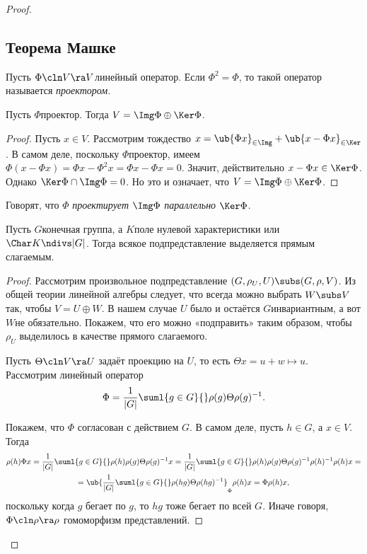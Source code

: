 \documentclass[a4paper]{article}
\newcommand{\sumlg}{\suml{g \in G}{}}
\begin{document}
\begin{proof}
\subsection{Теорема Машке}

\begin{df}
Пусть $\Phi\cln V \ra V$\т линейный оператор. Если $\Phi^2=\Phi$, то такой оператор  называется
\emph{проектором}.
\end{df}

\begin{theorem}
Пусть $\Phi$\т проектор. Тогда $V = \Img \Phi \oplus \Ker \Phi$.
\end{theorem}
\begin{proof}
Пусть $x \in V$. Рассмотрим тождество $x = \ub{\Phi x}_{\in \Img} + \ub{x - \Phi x}_{\in \Ker}$. В  самом
деле, поскольку $\Phi$\т проектор, имеем $\Phi(x-\Phi x) = \Phi x - \Phi^2 x = \Phi x - \Phi x = 0$. Значит,
действительно $x - \Phi x \in \Ker \Phi$. Однако $\Ker \Phi \cap \Img \Phi = 0$. Но это и означает, что $V =
\Img \Phi \oplus \Ker \Phi$.
\end{proof}

Говорят, что $\Phi$ \emph{проектирует} $\Img \Phi$ \emph{параллельно} $\Ker \Phi$.

\begin{theorem}
Пусть $G$\т конечная группа, а $K$\т поле нулевой характеристики или $\Char K \ndivs |G|$.  Тогда всякое
подпредставление выделяется прямым слагаемым.
\end{theorem}
\begin{proof}
Рассмотрим произвольное подпредставление $(G, \rho_U, U) \subs (G, \rho, V)$. Из общей  теории линейной
алгебры следует, что всегда можно выбрать $W \subs V$ так, чтобы $V = U \oplus W$. В нашем случае $U$ было и
остаётся $G$\д инвариантным, а вот $W$\т не обязательно. Покажем, что его можно «подправить» таким образом,
чтобы $\rho_U$ выделилось в качестве прямого слагаемого.

Пусть $\Theta\cln V \ra U$ задаёт проекцию на $U$, то есть $\Theta x = u + w \mapsto u$.  Рассмотрим линейный
оператор
$$
  \Phi = \frac{1}{|G|}\sumlg \rho(g) \Theta \rho(g)^{-1}.
$$

Покажем, что $\Phi$ согласован с действием $G$. В самом деле, пусть $h \in G$, а $x \in V$. Тогда
\begin{multline*}
\rho(h)\Phi x = \frac{1}{|G|}\sumlg \rho(h)\rho(g)\Theta \rho(g)^{-1} x=
\frac{1}{|G|}\sumlg \rho(h)\rho(g)\Theta \rho(g)^{-1}\rho(h)^{-1}\rho(h) x=\\
=\ub{\frac{1}{|G|}\sumlg \rho(hg)\Theta \rho(hg)^{-1}}_{\Phi}\rho(h)x = \Phi\rho(h)x,
\end{multline*}
поскольку когда $g$ бегает по $g$, то $hg$ тоже бегает по всей $G$. Иначе говоря, $\Phi\cln \rho \ra \rho$\т
гомоморфизм представлений.


\end{proof}
\end{proof}
\end{document}
